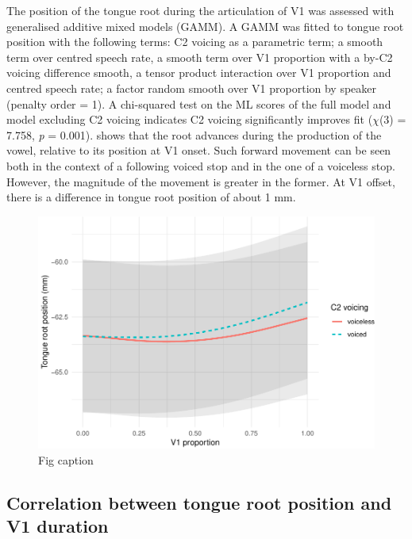 \documentclass[12pt,]{article}
\begin{document}
\label{s:trp-v1}

The position of the tongue root during the articulation of V1 was
assessed with generalised additive mixed models (GAMM). A GAMM was
fitted to tongue root position with the following terms: C2 voicing as a
parametric term; a smooth term over centred speech rate, a smooth term
over V1 proportion with a by-C2 voicing difference smooth, a tensor
product interaction over V1 proportion and centred speech rate; a factor
random smooth over V1 proportion by speaker (penalty order = 1). A
chi-squared test on the ML scores of the full model and model excluding
C2 voicing indicates C2 voicing significantly improves fit (\(\chi\)(3)
= 7.758, \emph{p} = 0.001).  shows that the root
advances during the production of the vowel, relative to its position at
V1 onset. Such forward movement can be seen both in the context of a
following voiced stop and in the one of a voiceless stop. However, the
magnitude of the movement is greater in the former. At V1 offset, there
is a difference in tongue root position of about 1 mm.

\begin{figure}
\includegraphics[width=\linewidth]{2018-tra_files/figure-latex/tra-gam-plot, -1} \caption{Fig caption}\label{f:tra-gam-plot, }
\end{figure}

\subsection{Correlation between tongue root position and V1
duration}\label{correlation-between-tongue-root-position-and-v1-duration}
\end{document}
